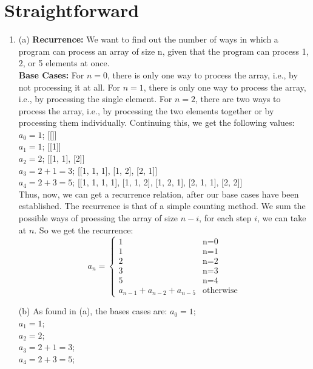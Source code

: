 \documentclass[a4paper]{article}
\begin{document}
\section{Straightforward}
\begin{enumerate}
    \item (a) \textbf{Recurrence:} We want to find out the number of ways in which a program can process an array of size n, given that the program can process 1, 2, or 5 elements at once.\\
    
    \textbf{Base Cases:} For $n = 0$, there is only one way to process the array, i.e., by not processing it at all. For $n = 1$, there is only one way to process the array, i.e., by processing the single element. For $n=2$, there are two ways to process the array, i.e., by processing the two elements together or by processing them individually. Continuing this, we get the following values:\\

    $a_{0} = 1$; [[]]\\
    $a_{1} = 1$; [[1]]\\
    $a_{2} = 2$; [[1, 1], [2]]\\
    $a_{3} = 2 + 1 = 3$; [[1, 1, 1], [1, 2], [2, 1]]\\
    $a_{4} = 2 + 3 = 5$; [[1, 1, 1, 1], [1, 1, 2], [1, 2, 1], [2, 1, 1], [2, 2]]\\

    Thus, now, we can get a recurrence relation, after our base cases have been established. The recurrence is that of a simple counting method. We sum the possible ways of proessing the array of size $n-i$, for each step $i$, we can take at $n$. So we get the recurrence:
    $$
    a_n = \begin{cases}
        1 & \text{n=0}\\
        1 & \text{n=1}\\
        2 & \text{n=2}\\
        3 & \text{n=3}\\
        5 & \text{n=4}\\
        a_{n-1} + a_{n-2} + a_{n-5} & \text{otherwise}
    \end{cases}
    $$


    (b) As found in (a), the bases cases are:
    $a_{0} = 1$;\\
    $a_{1} = 1$;\\
    $a_{2} = 2$;\\
    $a_{3} = 2 + 1 = 3$;\\
    $a_{4} = 2 + 3 = 5$;\\


\end{enumerate}
\end{document}
